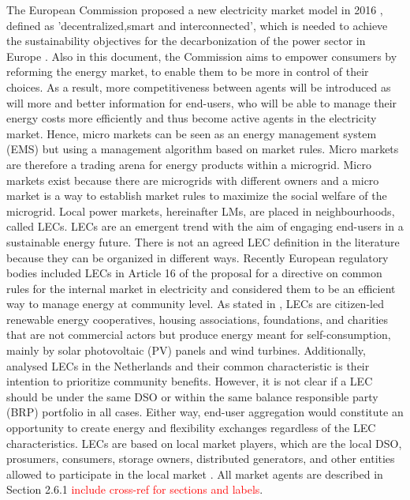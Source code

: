 The European Commission proposed a new electricity market model in 2016 \cite{validzic2017clean}, defined as 'decentralized,smart and interconnected', which is needed to achieve the sustainability objectives for the decarbonization of the power sector in Europe \cite{peng2017electricity}. Also in this document, the Commission aims to empower consumers by reforming the energy market, to enable them to be more in control of their choices. As a result, more competitiveness between agents will be introduced as will more and better information for end-users, who will be able to manage their energy costs more efficiently and thus become active agents in the electricity market.
Hence, micro markets can be seen as an energy management system (EMS) but using a management algorithm based on market rules. Micro markets are therefore a trading arena for energy products within a microgrid. Micro markets exist because there are microgrids with different owners and a micro market is a way to establish market rules to maximize the social welfare of the microgrid.
Local power markets, hereinafter LMs, are placed in neighbourhoods, called LECs. LECs are an emergent trend with the aim of engaging end-users in a sustainable energy future. There is not an agreed LEC definition in the literature because they can be organized in different ways. Recently European regulatory bodies included LECs in Article 16 of the proposal for a directive on common rules for the internal market in electricity \cite{validzic2017clean} and considered them to be an efficient way to manage energy at community level. 
As stated in \cite{sajn2016electricity}, LECs are citizen-led renewable energy cooperatives, housing associations, foundations, and charities that are not commercial actors but produce energy meant for self-consumption, mainly by solar photovoltaic (PV) panels and wind turbines. Additionally, \cite{van2015power} analysed LECs in the Netherlands and their common characteristic is their intention to prioritize community benefits. However, it is not clear if a LEC should be under the same DSO or within the same balance responsible party (BRP) portfolio in all cases. Either way, end-user aggregation would constitute an opportunity to create energy and flexibility exchanges regardless of the LEC characteristics. LECs are based on local market players, which are the local DSO, prosumers, consumers, storage owners, distributed generators, and other entities allowed to participate in the local market \cite{faber2014micro}. All market agents are described in Section 2.6.1 \textcolor{red}{include cross-ref for sections and labels}.

